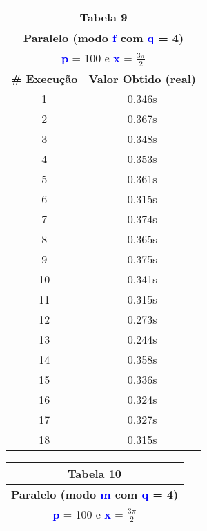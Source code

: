 \documentclass[11pt]{article}
\begin{document}
\begin{table}[!h]
	\begin{center}
		\begin{minipage}{0.48\textwidth}
			\begin{tabular}{| c | c |}
			\hline
			\multicolumn{2}{|c|}{\textbf{Tabela 9}} \\ \hline
			\multicolumn{2}{|c|}{\textbf{Paralelo (modo \textbf{\textcolor{blue}{f}} com \textbf{\textcolor{blue}{q}} = 4)}} \\
			\multicolumn{2}{|c|}{\textbf{\textcolor{blue}{p}} = 100 e \textbf{\textcolor{blue}{x}} = $\frac{3\pi}{2}$} \\ [0.2ex]
			\hline
				\textbf{\# Execução} &  \textbf{Valor Obtido (real)} \\ \hline
				1 & 0.346s \\ \hline
				2 & 0.367s \\ \hline
				3 & 0.348s \\ \hline
				4 & 0.353s \\ \hline
				5 & 0.361s \\ \hline
				6 & 0.315s \\ \hline
				7 & 0.374s \\ \hline
				8 & 0.365s \\ \hline
				9 & 0.375s \\ \hline
				10 & 0.341s \\ \hline
				11 & 0.315s \\ \hline
				12 & 0.273s \\ \hline
				13 & 0.244s \\ \hline
				14 & 0.358s \\ \hline
				15 & 0.336s \\ \hline
				16 & 0.324s \\ \hline
				17 & 0.327s \\ \hline
				18 & 0.315s \\ \hline
			\end{tabular}
		\end{minipage}
		\begin{minipage}{0.48\textwidth}
			\begin{tabular}{| c | c |}
			\hline
			\multicolumn{2}{|c|}{\textbf{Tabela 10}} \\ \hline
			\multicolumn{2}{|c|}{\textbf{Paralelo (modo \textbf{\textcolor{blue}{m}} com \textbf{\textcolor{blue}{q}} = 4)}} \\
			\multicolumn{2}{|c|}{\textbf{\textcolor{blue}{p}} = 100 e \textbf{\textcolor{blue}{x}} = $\frac{3\pi}{2}$} \\ [0.2ex]

\end{tabular}
\end{minipage}
\end{center}
\end{table}
\end{document}
